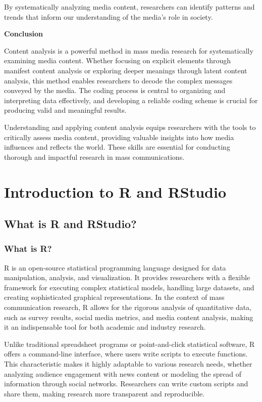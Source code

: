 \documentclass[
]{book}
\begin{document}
By systematically analyzing media content, researchers can identify patterns and trends that inform our understanding of the media's role in society.

\textbf{Conclusion}

Content analysis is a powerful method in mass media research for systematically examining media content. Whether focusing on explicit elements through manifest content analysis or exploring deeper meanings through latent content analysis, this method enables researchers to decode the complex messages conveyed by the media. The coding process is central to organizing and interpreting data effectively, and developing a reliable coding scheme is crucial for producing valid and meaningful results.

Understanding and applying content analysis equips researchers with the tools to critically assess media content, providing valuable insights into how media influences and reflects the world. These skills are essential for conducting thorough and impactful research in mass communications.

\chapter{Introduction to R and RStudio}\label{introduction-to-r-and-rstudio}

\section{What is R and RStudio?}\label{what-is-r-and-rstudio}

\subsection*{What is R?}\label{what-is-r}

R is an open-source statistical programming language designed for data manipulation, analysis, and visualization. It provides researchers with a flexible framework for executing complex statistical models, handling large datasets, and creating sophisticated graphical representations. In the context of mass communication research, R allows for the rigorous analysis of quantitative data, such as survey results, social media metrics, and media content analysis, making it an indispensable tool for both academic and industry research.

Unlike traditional spreadsheet programs or point-and-click statistical software, R offers a command-line interface, where users write scripts to execute functions. This characteristic makes it highly adaptable to various research needs, whether analyzing audience engagement with news content or modeling the spread of information through social networks. Researchers can write custom scripts and share them, making research more transparent and reproducible.
\end{document}
